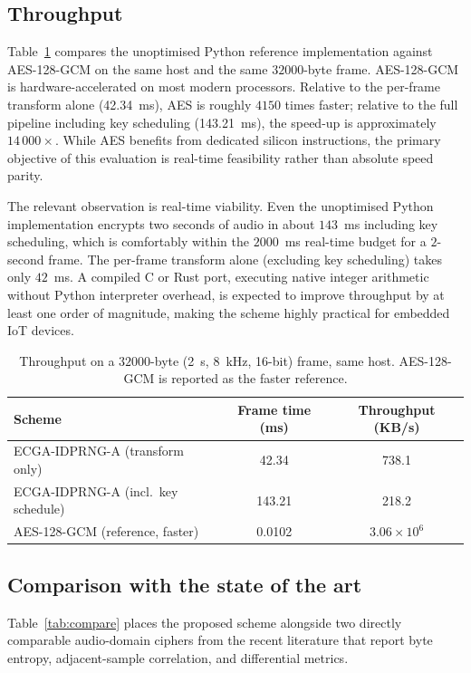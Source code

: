 \documentclass[pdflatex,sn-mathphys-num]{sn-jnl}%
\theoremstyle{thmstyleone}%
\theoremstyle{thmstyletwo}%
\theoremstyle{thmstylethree}%
\begin{document}
\subsection{Throughput}
\label{sec:throughput}

Table~\ref{tab:through} compares the unoptimised Python reference implementation against AES-128-GCM on the same host and the same $32000$-byte frame. AES-128-GCM is hardware-accelerated on most modern processors. Relative to the per-frame transform alone (42.34~ms), AES is roughly $4150$ times faster; relative to the full pipeline including key scheduling (143.21~ms), the speed-up is approximately $14\,000\times$. While AES benefits from dedicated silicon instructions, the primary objective of this evaluation is real-time feasibility rather than absolute speed parity.

The relevant observation is real-time viability. Even the unoptimised Python implementation encrypts two seconds of audio in about $143$~ms including key scheduling, which is comfortably within the $2000$~ms real-time budget for a $2$-second frame. The per-frame transform alone (excluding key scheduling) takes only $42$~ms. A compiled C or Rust port, executing native integer arithmetic without Python interpreter overhead, is expected to improve throughput by at least one order of magnitude, making the scheme highly practical for embedded IoT devices.

\begin{table}[htbp]
\centering
\caption{Throughput on a $32000$-byte (2~s, 8~kHz, 16-bit) frame, same host. AES-128-GCM is reported as the faster reference.}
\label{tab:through}
\small
\begin{tabular}{lcc}
\toprule
\textbf{Scheme} & \textbf{Frame time (ms)} & \textbf{Throughput (KB/s)} \\
\midrule
ECGA-IDPRNG-A (transform only) & 42.34 & 738.1 \\
ECGA-IDPRNG-A (incl.\ key schedule) & 143.21 & 218.2 \\
AES-128-GCM (reference, faster) & 0.0102 & $3.06\times10^{6}$ \\
\bottomrule
\end{tabular}
\end{table}

\subsection{Comparison with the state of the art}
\label{sec:compare}
Table~\ref{tab:compare} places the proposed scheme alongside two directly comparable audio-domain ciphers from the recent literature that report byte entropy, adjacent-sample correlation, and differential metrics.
\end{document}
